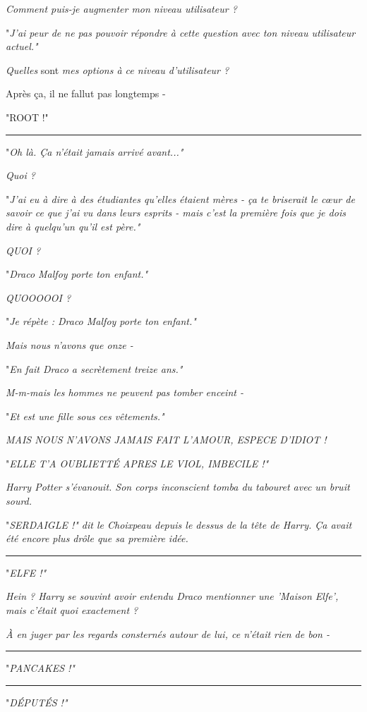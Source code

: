 \emph{Comment puis-je augmenter mon niveau utilisateur ?} 

"\emph{J'ai peur de ne pas pouvoir répondre à cette question avec ton niveau utilisateur actuel."} 

\emph{Quelles } sont\emph{ mes options à ce niveau d'utilisateur ?} 

Après ça, il ne fallut pas longtemps -

"ROOT !"
\par\noindent\rule{\textwidth}{0.4pt}
"\emph{Oh là. Ça n'était jamais arrivé avant..."} 

\emph{Quoi ?} 

"\emph{J'ai eu à dire à des étudiantes qu'elles étaient mères - ça te briserait le cœur de savoir ce que j'ai vu dans leurs esprits - mais c'est la première fois que je dois dire à quelqu'un qu'il est père."} 

\emph{QUOI ?} 

"\emph{Draco Malfoy porte ton enfant."} 

\emph{QUOOOOOI ?} 

"\emph{Je répète : Draco Malfoy porte ton enfant."} 

\emph{Mais nous n'avons que onze -} 

"\emph{En fait Draco a secrètement treize ans."} 

\emph{M-m-mais les hommes ne peuvent pas tomber enceint -} 

"\emph{Et est une fille sous ces vêtements."} 

\emph{MAIS NOUS N'AVONS JAMAIS FAIT L'AMOUR, ESPECE D'IDIOT !} 

"\emph{ELLE T'A OUBLIETTÉ APRES LE VIOL, IMBECILE !"} 

\emph{Harry Potter s'évanouit. Son corps inconscient tomba du tabouret avec un bruit sourd.} 

"\emph{SERDAIGLE !" dit le Choixpeau depuis le dessus de la tête de Harry. Ça avait été encore plus drôle que sa première idée.} 
\par\noindent\rule{\textwidth}{0.4pt}
"\emph{ELFE !"} 

\emph{Hein ? Harry se souvint avoir entendu Draco mentionner une 'Maison Elfe', mais c'était quoi exactement ?} 

\emph{À en juger par les regards consternés autour de lui, ce n'était rien de bon -} 
\par\noindent\rule{\textwidth}{0.4pt}
"\emph{PANCAKES !"} 
\par\noindent\rule{\textwidth}{0.4pt}
"\emph{DÉPUTÉS !"} 

